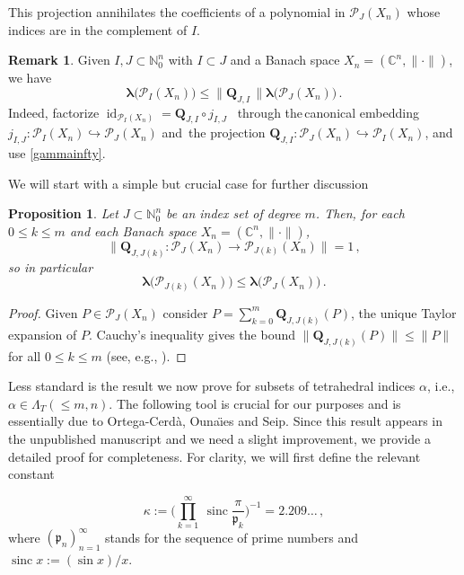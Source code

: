 \documentclass[12pt]{amsart}
\numberwithin{subsection}{section}
\newtheorem{proposition}[theorem]{Proposition}
\theoremstyle{definition}
\newtheorem{remark}[theorem]{Remark}
\theoremstyle{remark}
\DeclareMathOperator{\id}{\mathrm{id}}
\newcommand{\sinc}{\operatorname{sinc}}
\begin{document}
This projection annihilates the coefficients of a polynomial in $\mathcal{P}_J(X_n)$ whose indices are in the complement of $I$.

\begin{remark} \label{simple}
Given $I,J \subset  \mathbb{N}_0^n$ with $I \subset J$ and a  Banach space $X_n= (\mathbb{C}^n, \|\cdot\|)$, we have
\[
\boldsymbol{\lambda}\big(\mathcal{P}_{I}(X_n)
\big) \leq \|\mathbf{Q}_{J,I}\, \| \boldsymbol{\lambda}\big(\mathcal{P}_J(X_n)\big)\,.
\]
Indeed, factorize $\id_{\mathcal{P}_I(X_n)} = \mathbf{Q}_{J,I}\circ j_{I,J}$ \, through the\,canonical embedding
$j_{I,J}\colon \mathcal{P}_I(X_n)\hookrightarrow \mathcal{P}_J(X_n)$ and \,the
projection $\mathbf{Q}_{J,I}: \mathcal{P}_J(X_n)\hookrightarrow \mathcal{P}_I(X_n)$, and use \eqref{gammainfty}.
\end{remark}


We will start with a simple but crucial case for further discussion


\begin{proposition} \label{prop: homogeneous part proj constant}
Let $J \subset \mathbb{N}_0^n$ be an index set of degree $m$. Then, for each $0 \leq k \leq m$ and each Banach space
$X_n = (\mathbb{C}^n, \|\cdot\|)$,
\[
\big\|\mathbf{Q}_{J,J(k)}\colon \mathcal{P}_J(X_n) \to \mathcal{P}_{J(k)}(X_n)\big\| =1\,,
\]
so in particular
\[
\boldsymbol{\lambda}\big(\mathcal{P}_{J(k)}(X_n)\big) \leq  \boldsymbol{\lambda}\big(\mathcal{P}_J(X_n)\big)\,.
\]
\end{proposition}

\begin{proof}
Given  $P \in \mathcal{P}_J(X_n)$ consider
$
P = \sum_{k=0}^{m} \mathbf{Q}_{J,J(k)}(P)$, the unique Taylor expansion of $P$. Cauchy's inequality gives the bound
$\|\mathbf{Q}_{J,J(k)}(P)\| \leq \|P\|$ for all $0 \leq k \leq m$ (see, e.g., \cite[Proposition 15.33]{defant2019libro}).
\end{proof}


Less standard is the result we now prove for subsets of tetrahedral indices $\alpha$, i.e., $\alpha \in \Lambda_T( \leq m,n)$.
The following tool is crucial for our purposes and is essentially due to Ortega-Cerd\`a, Ouna\"{\i}es and Seip. Since this result
appears in the unpublished manuscript \cite{ortega2009sidon} and we need a slight improvement, we provide a detailed proof for
completeness. For clarity, we will first define the relevant constant

\begin{equation*}
\kappa:=\bigg(\prod_{k=1}^\infty\ \sinc{\frac{\pi}{\mathfrak{p}_k}}\bigg)^{-1}=2.209\ldots\,,
\end{equation*}
where  $(\mathfrak{p}_n)_{n=1}^{\infty}$ stands for the  sequence of prime numbers and $\sinc x:=(\sin x)/x$.
\end{document}

